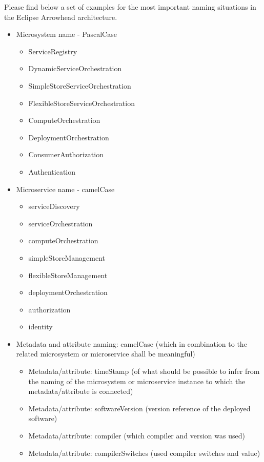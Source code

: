 \documentclass[a4paper]{arrowhead}
\begin{document}
Please find below a set of examples for the most important naming
situations in the Eclipse Arrowhead architecture.
\begin{itemize}
\item Microsystem name - PascalCase
  \begin{itemize}
  \item ServiceRegistry
  \item DynamicServiceOrchestration
  \item SimpleStoreServiceOrchestration
  \item FlexibleStoreServiceOrchestration
  \item ComputeOrchestration
  \item DeploymentOrchestration
  \item ConsumerAuthorization
  \item Authentication
  \end{itemize}
  
\item Microservice name - camelCase
  \begin{itemize}
  \item serviceDiscovery
  \item serviceOrchestration
  \item computeOrchestration
  \item simpleStoreManagement
  \item flexibleStoreManagement
  \item deploymentOrchestration
  \item authorization
  \item identity
  \end{itemize}

 \item Metadata and attribute naming: camelCase (which in combination to the
  related microsystem or microservice shall be meaningful)
  \begin{itemize}
  \item Metadata/attribute: timeStamp (of what should be possible to infer from
    the naming of the microsystem or microservice instance to which the
    metadata/attribute is connected)
  \item Metadata/attribute: softwareVersion (version reference of the
    deployed software)
  \item Metadata/attribute: compiler (which compiler and version was used)
  \item Metadata/attribute: compilerSwitches (used compiler switches
    and value) 
  \end{itemize}

\end{itemize} 
\end{document}

